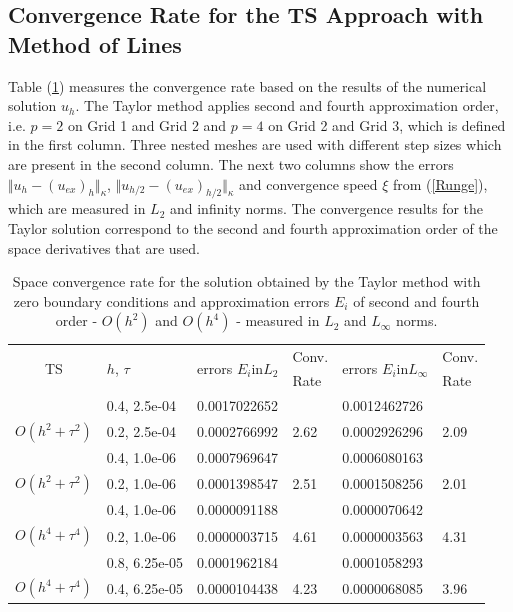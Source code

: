 \documentclass[%
 aip,
cp,  
 amsmath,amssymb,
 reprint,
]{iopconfser}
\newcommand{\rf}[1]{(\ref{#1})}
\begin{document}
\subsection{Convergence Rate for the TS Approach with Method of Lines}

Table \rf{tableA} measures the convergence rate based on the results of the numerical solution $u_h$. The Taylor method applies second and fourth approximation order, i.e. $p=2$ on Grid 1 and Grid 2 and $p=4$ on Grid 2 and Grid 3, which is defined in the first column. 
 Three nested meshes are used with different step sizes which are present in the second column. The next two columns show the errors $\Vert u_{h} - (u_{ex})_{h} \Vert_\kappa$, $\Vert  u_{h/2} - (u_{ex})_{h/2} \Vert_\kappa$ and convergence speed $\xi$ from \rf{Runge}, which are measured in $L_2$ and infinity norms. The convergence results for the Taylor solution correspond to the second and fourth approximation order of the space derivatives that are used. 
\begin{table}[ht]
\centering
\small
		\begin{tabular}{||c|l|ll|ll||}
			\hline
			\hline
      \multirow{2  }{*}{TS}        & \multirow{2  }{*}{$h$, $\tau$}  & \multirow{2  }{*}{errors $E_i$in$L_2$}  &Conv.& \multirow{2  }{*}{errors $E_i$in$L_\infty$}  &Conv.  \\
	         &                    &                               & Rate   &                                        & Rate \\
   			\hline 
					\hline 
                                 &0.4, 2.5e-04          &0.0017022652 &            &0.0012462726    &      \\
      $O(h^2 + \tau^ 2)$ &0.2, 2.5e-04          &0.0002766992 & 2.62    &0.0002926296    &  2.09       \\
			\hline 
                                   &0.4, 1.0e-06        &0.0007969647 &            &0.0006080163    &      \\
      $O(h^2 + \tau^ 2)$ &0.2, 1.0e-06          &0.0001398547 & 2.51   &0.0001508256    &  2.01       \\
			\hline 
                                  &0.4, 1.0e-06        &  0.0000091188  &            &0.0000070642 &   \\
   $O(h^4+ \tau^4)$   &0.2, 1.0e-06          &0.0000003715   &4.61  &0.0000003563  & 4.31 \\
			\hline
                                 &0.8, 6.25e-05    & 0.0001962184   &        &  0.0001058293   &   \\
 $O(h^4+ \tau^4)$    &0.4, 6.25e-05     &0.0000104438 & 4.23  & 0.0000068085  & 3.96  \\
    \hline
			\hline 
		\end{tabular}
		\caption{Space convergence rate for the solution obtained by the Taylor method with zero boundary conditions and approximation errors $E_i$ of second and fourth order - $O(h^{2})$ and $O(h^{4})$ - measured in $L_2$ and $L_\infty$ norms.}
\label{tableA}
\end{table}
\end{document}
